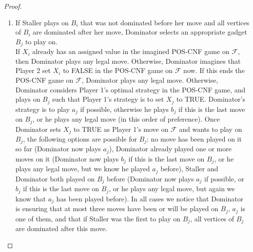 \documentclass[12pt]{article}
\newcommand{\F}{\mathcal{F}}
\begin{document}
\begin{proof}
\begin{enumerate}[(1)]
		\item If Staller plays on $B_i$ that was not dominated before her move and all vertices of $B_i$ are dominated after her move, Dominator selects an appropriate gadget $B_{j}$ to play on.\\
		If $X_i$ already has an assigned value in the imagined POS-CNF game on $\F$, then Dominator plays any legal move. Otherwise, Dominator imagines that Player 2 set $X_i$ to FALSE in the POS-CNF game on $\F$ now. If this ends the POS-CNF game on $\F$, Dominator plays any legal move. Otherwise, Dominator considers Player 1's optimal strategy in the POS-CNF game, and plays on $B_{j}$ such that Player 1's strategy is to set $X_{j}$ to TRUE. Dominator's strategy is to play $a_j$ if possible, otherwise he plays $b_j$ if this is the last move on $B_j$, or he plays any legal move (in this order of preference). Once Dominator sets $X_j$ to TRUE as Player 1's move on $\F$ and wants to play on $B_j$, the following options are possible for $B_j$: no move has been played on it so far (Dominator now plays $a_j$), Dominator already played one or more moves on it (Dominator now plays $b_j$ if this is the last move on $B_j$, or he plays any legal move, but we know he played $a_j$ before), Staller and Dominator both played on $B_j$ before (Dominator now plays $a_j$ if possible, or $b_j$ if this is the last move on $B_j$, or he plays any legal move, but again we know that $a_j$ has been played before). In all cases we notice that Dominator is ensuring that at most three moves have been or will be played on $B_j$, $a_j$ is one of them, and that if Staller was the first to play on $B_j$, all vertices of $B_j$ are dominated after this move.
		

\end{enumerate}
\end{proof}
\end{document}
